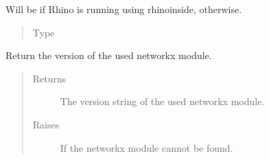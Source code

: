 \documentclass[letterpaper,10pt,english]{sphinxmanual}
\begin{document}

\begin{fulllineitems}
\label{\detokenize{cockatoo:cockatoo.environment.RHINOINSIDE}}
Will be  if Rhino is running using rhinoinside, 
otherwise.
\begin{quote}\begin{description}
\item[{Type}] \leavevmode
{}

\end{description}\end{quote}

\end{fulllineitems}


\begin{fulllineitems}
\label{\detokenize{cockatoo:cockatoo.environment.networkx_version}}
Return the version of the used networkx module.
\begin{quote}\begin{description}
\item[{Returns}] \leavevmode
{} \textendash{} The version string of the used networkx module.

\item[{Raises}] \leavevmode
{\hyperref[\detokenize{cockatoo:cockatoo.exception.NetworkXNotPresentError}]{}} \textendash{} If the networkx module cannot be found.

\end{description}\end{quote}

\end{fulllineitems}

\end{document}
